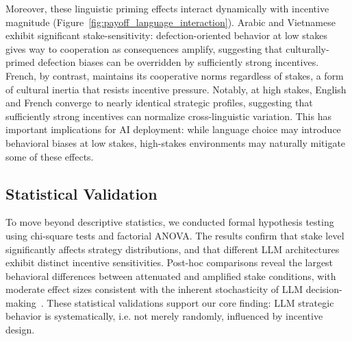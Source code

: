 \documentclass{article}
\begin{document}
Moreover, these linguistic priming effects interact dynamically with incentive magnitude (Figure~\ref{fig:payoff_language_interaction}). Arabic and Vietnamese exhibit significant stake-sensitivity: defection-oriented behavior at low stakes gives way to cooperation as consequences amplify, suggesting that culturally-primed defection biases can be overridden by sufficiently strong incentives. French, by contrast, maintains its cooperative norms regardless of stakes, a form of cultural inertia that resists incentive pressure. Notably, at high stakes, English and French converge to nearly identical strategic profiles, suggesting that sufficiently strong incentives can normalize cross-linguistic variation. This has important implications for AI deployment: while language choice may introduce behavioral biases at low stakes, high-stakes environments may naturally mitigate some of these effects.







\FloatBarrier


\subsection{Statistical Validation}
\label{sec:statistical_validation}

To move beyond descriptive statistics, we conducted formal hypothesis testing using chi-square tests and factorial ANOVA. The results confirm that stake level significantly affects strategy distributions, and that different LLM architectures exhibit distinct incentive sensitivities. Post-hoc comparisons reveal the largest behavioral differences between attenuated and amplified stake conditions, with moderate effect sizes consistent with the inherent stochasticity of LLM decision-making~\cite{fontana2025nicer}. These statistical validations support our core finding: LLM strategic behavior is systematically, i.e. not merely randomly, influenced by incentive design.

 
\end{document}
